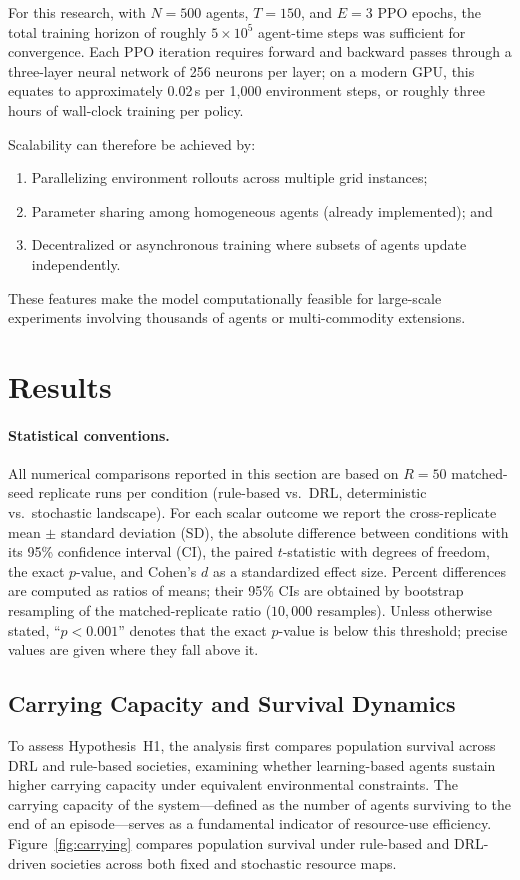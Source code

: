 \documentclass[pdflatex,sn-mathphys-num]{sn-jnl}%
\theoremstyle{thmstyleone}%
\theoremstyle{thmstyletwo}%
\theoremstyle{thmstylethree}%
\begin{document}
For this research, with \(N=500\) agents, \(T=150\), and \(E=3\) PPO epochs, the total training horizon of roughly \(5\times10^{5}\) agent-time steps was sufficient for convergence.  
Each PPO iteration requires forward and backward passes through a three-layer neural network of 256 neurons per layer; on a modern GPU, this equates to approximately 0.02\,s per 1{,}000 environment steps, or roughly three hours of wall-clock training per policy.

Scalability can therefore be achieved by:
\begin{enumerate}
    \item Parallelizing environment rollouts across multiple grid instances;
    \item Parameter sharing among homogeneous agents (already implemented); and
    \item Decentralized or asynchronous training where subsets of agents update independently.
\end{enumerate}
These features make the model computationally feasible for large-scale experiments involving thousands of agents or multi-commodity extensions.


\section{Results}
\label{sec:results}

\paragraph{Statistical conventions.}
All numerical comparisons reported in this section are based on $R = 50$ matched-seed replicate runs per condition (rule-based vs.\ DRL, deterministic vs.\ stochastic landscape).  
For each scalar outcome we report the cross-replicate mean $\pm$ standard deviation (SD), the absolute difference between conditions with its 95\% confidence interval (CI), the paired $t$-statistic with degrees of freedom, the exact $p$-value, and Cohen's $d$ as a standardized effect size.  
Percent differences are computed as ratios of means; their 95\% CIs are obtained by bootstrap resampling of the matched-replicate ratio ($10{,}000$ resamples).  
Unless otherwise stated, ``$p < 0.001$'' denotes that the exact $p$-value is below this threshold; precise values are given where they fall above it.

\subsection{Carrying Capacity and Survival Dynamics}
To assess Hypothesis~H1, the analysis first compares population survival across DRL and rule-based societies, examining whether learning-based agents sustain higher carrying capacity under equivalent environmental constraints.
The carrying capacity of the system---defined as the number of agents surviving to the end of an episode---serves as a fundamental indicator of resource-use efficiency.  
Figure~\ref{fig:carrying} compares population survival under rule-based and DRL-driven societies across both fixed and stochastic resource maps.
\end{document}

